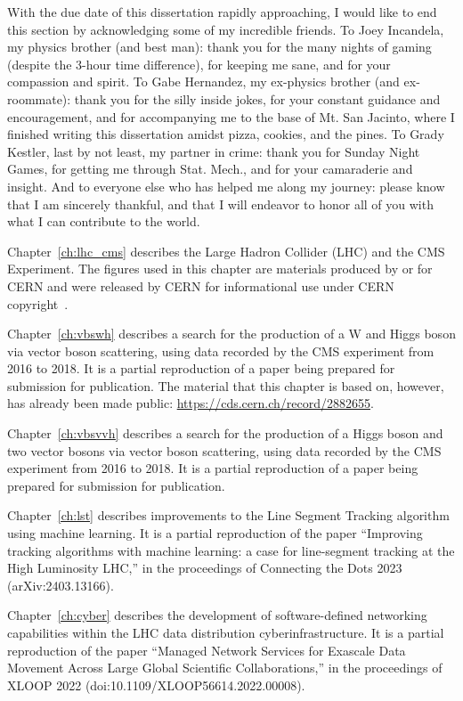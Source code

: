 \begin{acknowledgements}
With the due date of this dissertation rapidly approaching, I would like to end this section by acknowledging some of my incredible friends. 
To Joey Incandela, my physics brother (and best man): thank you for the many nights of gaming (despite the 3-hour time difference), for keeping me sane, and for your compassion and spirit. 
To Gabe Hernandez, my ex-physics brother (and ex-roommate): thank you for the silly inside jokes, for your constant guidance and encouragement, and for accompanying me to the base of Mt. San Jacinto, where I finished writing this dissertation amidst pizza, cookies, and the pines. 
To Grady Kestler, last by not least, my partner in crime: thank you for Sunday Night Games, for getting me through Stat. Mech., and for your camaraderie and insight. 
And to everyone else who has helped me along my journey: please know that I am sincerely thankful, and that I will endeavor to honor all of you with what I can contribute to the world. 

Chapter~\ref{ch:lhc_cms} describes the Large Hadron Collider (LHC) and the CMS Experiment. 
The figures used in this chapter are materials produced by or for CERN and were released by CERN for informational use under CERN copyright~\cite{CERNCopyright}. 

Chapter~\ref{ch:vbswh} describes a search for the production of a W and Higgs boson via vector boson scattering, using data recorded by the CMS experiment from 2016 to 2018. 
It is a partial reproduction of a paper being prepared for submission for publication. 
The material that this chapter is based on, however, has already been made public: \url{https://cds.cern.ch/record/2882655}.

Chapter~\ref{ch:vbsvvh} describes a search for the production of a Higgs boson and two vector bosons via vector boson scattering, using data recorded by the CMS experiment from 2016 to 2018. 
It is a partial reproduction of a paper being prepared for submission for publication. 

Chapter~\ref{ch:lst} describes improvements to the Line Segment Tracking algorithm using machine learning. 
It is a partial reproduction of the paper ``Improving tracking algorithms with machine learning: a case for line-segment tracking at the High Luminosity LHC,'' in the proceedings of Connecting the Dots 2023 (arXiv:2403.13166). 

Chapter~\ref{ch:cyber} describes the development of software-defined networking capabilities within the LHC data distribution cyberinfrastructure. 
It is a partial reproduction of the paper ``Managed Network Services for Exascale Data Movement Across Large Global Scientific Collaborations,'' in the proceedings of XLOOP 2022 (doi:10.1109/XLOOP56614.2022.00008). 

\end{acknowledgements}
